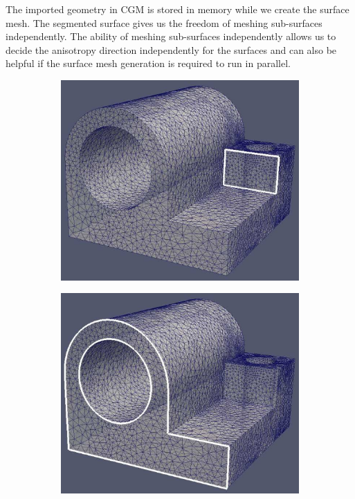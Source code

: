 \documentclass[conf]{new-aiaa}
\begin{document}
The imported geometry in CGM is stored in memory while we create the surface mesh.  The segmented surface gives us the freedom of meshing sub-surfaces independently. The ability of meshing sub-surfaces independently allows us to decide the anisotropy direction independently for the surfaces and can also be helpful if the surface mesh generation is required to run in parallel.

\begin{figure}[hbt!]
\centering
\begin{subfigure}{.5\textwidth}
  \centering
  \includegraphics[width=.8\linewidth]{surface-segmentation/surf0.eps}
  \caption{}
  \label{surf0}
\end{subfigure}%
\begin{subfigure}{.5\textwidth}
  \centering
  \includegraphics[width=.8\linewidth]{surface-segmentation/surf3.eps}
  \caption{}
  \label{surf1}

\end{subfigure}
\end{figure}
\end{document}
